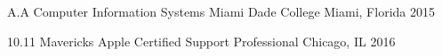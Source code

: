 

\begin{cventries}

  \cventry
    {A.A Computer Information Systems} %
    {Miami Dade College} %
    {Miami, Florida} %
    {2015} %
    {

    }
    \cventry
    {10.11 Mavericks} %
    {Apple Certified Support Professional} %
    {Chicago, IL} %
    {2016} %
    {
      
    }

\end{cventries}
